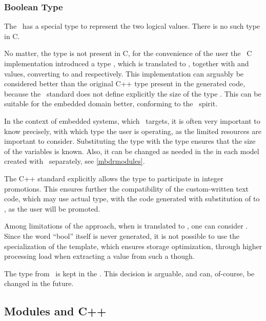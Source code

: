 \subsubsection{Boolean Type}

The \cpppl\ has a special  type to represent the two logical values. There is no such type in C.

No matter, the  type is not present in C, for the convenience of the user the \mb\ C implementation introduced a type ,
which is translated to , together with  and  values, converting to  and  respectively.
This implementation can arguably be considered better than the original C++  type present in the generated code, because the \cpppl\ standard
does not define explicitly the size of the  type \cite{cpp11}. This can be suitable for the embedded domain better, conforming to the
\mbdr\ spirit.

In the context of embedded systems, which \mbdr\ targets, it is often very important to 
know precisely, with which type the user is operating, as the limited resources
are important to consider. Substituting the  type with the  type ensures that the size of 
the  variables is known. Also, it can be changed as needed in the 
 in each model created with \mb\ separately, see \ref{mbdrmodules}.

The C++ standard explicitly allows the  type to participate in integer promotions. 
This ensures further the compatibility of the custom-written text code, which may use actual 
 type, with the code generated with substitution of  to , 
as the user  will be promoted.

Among limitations of the approach, when  is translated to , one can consider . 
Since the word ``bool'' itself is never generated, it is not possible to use the specialization 
of the template, which ensures storage optimization, through higher processing load when
extracting a value from such a  though.

The  type from \mbdr\ is kept in the \pcpp. This decision is arguable, and can, of-course, be
changed in the future.

\subsection{Modules and C++}

